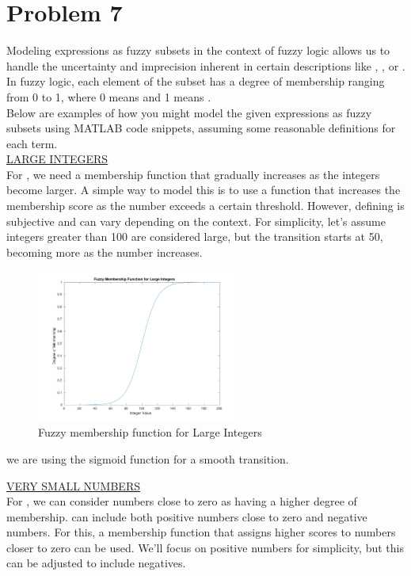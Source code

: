 \section{Problem 7}
Modeling expressions as fuzzy subsets in the context of fuzzy logic allows us to handle the uncertainty and imprecision inherent in certain descriptions like , , or . In fuzzy logic, each element of the subset has a degree of membership ranging from 0 to 1, where 0 means  and 1 means .\\
Below are examples of how you might model the given expressions as fuzzy subsets using MATLAB code snippets, assuming some reasonable definitions for each term.\\

\underline{LARGE INTEGERS}\\
For , we need a membership function that gradually increases as the integers become larger. A simple way to model this is to use a function that increases the membership score as the number exceeds a certain threshold. However, defining  is subjective and can vary depending on the context. For simplicity, let's assume integers greater than 100 are considered large, but the transition starts at 50, becoming more  as the number increases.

\begin{figure}[h]
	\centering
	\includegraphics[width=0.6\textwidth]{../Problem 7/large_int.pdf}
	\caption{Fuzzy membership function for Large Integers}	
\end{figure}
we are using the sigmoid function for a smooth transition.
\vspace{5mm}

\underline{VERY SMALL NUMBERS}\\
For , we can consider numbers close to zero as having a higher degree of membership.  can include both positive numbers close to zero and negative numbers. For this, a membership function that assigns higher scores to numbers closer to zero can be used. We'll focus on positive numbers for simplicity, but this can be adjusted to include negatives.

